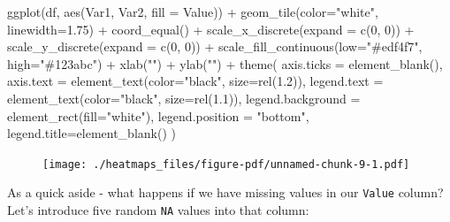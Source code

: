 \documentclass[
  letterpaper,
  DIV=11,
  numbers=noendperiod]{scrreprt}
\newenvironment{Shaded}{\begin{snugshade}}{\end{snugshade}}
\newcommand{\AttributeTok}[1]{\textcolor[rgb]{0.40,0.45,0.13}{#1}}
\newcommand{\DecValTok}[1]{\textcolor[rgb]{0.68,0.00,0.00}{#1}}
\newcommand{\FloatTok}[1]{\textcolor[rgb]{0.68,0.00,0.00}{#1}}
\newcommand{\FunctionTok}[1]{\textcolor[rgb]{0.28,0.35,0.67}{#1}}
\newcommand{\NormalTok}[1]{\textcolor[rgb]{0.00,0.23,0.31}{#1}}
\newcommand{\SpecialCharTok}[1]{\textcolor[rgb]{0.37,0.37,0.37}{#1}}
\newcommand{\StringTok}[1]{\textcolor[rgb]{0.13,0.47,0.30}{#1}}
\begin{document}
\begin{Shaded}
\begin{Highlighting}[]
\FunctionTok{ggplot}\NormalTok{(df, }\FunctionTok{aes}\NormalTok{(Var1, Var2, }\AttributeTok{fill =}\NormalTok{ Value)) }\SpecialCharTok{+} 
  \FunctionTok{geom\_tile}\NormalTok{(}\AttributeTok{color=}\StringTok{"white"}\NormalTok{, }\AttributeTok{linewidth=}\FloatTok{1.75}\NormalTok{) }\SpecialCharTok{+}
  \FunctionTok{coord\_equal}\NormalTok{() }\SpecialCharTok{+}
  \FunctionTok{scale\_x\_discrete}\NormalTok{(}\AttributeTok{expand =} \FunctionTok{c}\NormalTok{(}\DecValTok{0}\NormalTok{, }\DecValTok{0}\NormalTok{)) }\SpecialCharTok{+}
  \FunctionTok{scale\_y\_discrete}\NormalTok{(}\AttributeTok{expand =} \FunctionTok{c}\NormalTok{(}\DecValTok{0}\NormalTok{, }\DecValTok{0}\NormalTok{)) }\SpecialCharTok{+} 
  \FunctionTok{scale\_fill\_continuous}\NormalTok{(}\AttributeTok{low=}\StringTok{"\#edf4f7"}\NormalTok{, }\AttributeTok{high=}\StringTok{"\#123abc"}\NormalTok{) }\SpecialCharTok{+}
  \FunctionTok{xlab}\NormalTok{(}\StringTok{""}\NormalTok{) }\SpecialCharTok{+} 
  \FunctionTok{ylab}\NormalTok{(}\StringTok{""}\NormalTok{) }\SpecialCharTok{+}
  \FunctionTok{theme}\NormalTok{(}
    \AttributeTok{axis.ticks =} \FunctionTok{element\_blank}\NormalTok{(), }
    \AttributeTok{axis.text =} \FunctionTok{element\_text}\NormalTok{(}\AttributeTok{color=}\StringTok{"black"}\NormalTok{, }\AttributeTok{size=}\FunctionTok{rel}\NormalTok{(}\FloatTok{1.2}\NormalTok{)),}
    \AttributeTok{legend.text =} \FunctionTok{element\_text}\NormalTok{(}\AttributeTok{color=}\StringTok{"black"}\NormalTok{, }\AttributeTok{size=}\FunctionTok{rel}\NormalTok{(}\FloatTok{1.1}\NormalTok{)),}
    \AttributeTok{legend.background =} \FunctionTok{element\_rect}\NormalTok{(}\AttributeTok{fill=}\StringTok{"white"}\NormalTok{),}
    \AttributeTok{legend.position =} \StringTok{"bottom"}\NormalTok{,}
    \AttributeTok{legend.title=}\FunctionTok{element\_blank}\NormalTok{()}
\NormalTok{  ) }
\end{Highlighting}
\end{Shaded}

\begin{figure}[H]

{\centering \texttt{[image: ./heatmaps\_files/figure-pdf/unnamed-chunk-9-1.pdf]}

}

\end{figure}

As a quick aside - what happens if we have missing values in our
\texttt{Value} column? Let's introduce five random \texttt{NA} values
into that column:
\end{document}
